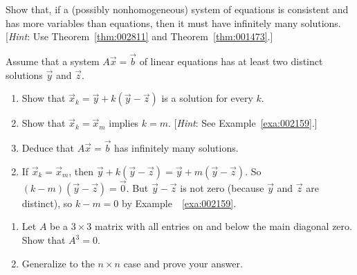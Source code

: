 \documentclass{ximera}
\begin{document}
\begin{problem}
Show that, if a (possibly nonhomogeneous) system of equations is consistent and has more variables than equations, then it must have infinitely many solutions. [\textit{Hint}: Use Theorem~\ref{thm:002811} and Theorem~\ref{thm:001473}.]

\end{problem}

\begin{problem}
Assume that a system $A\vec{x} = \vec{b}$ of linear equations has at least two distinct solutions $\vec{y}$ and $\vec{z}$.


\begin{enumerate}[label={\alph*.}]
\item Show that $\vec{x}_{k} = \vec{y} + k(\vec{y} - \vec{z})$ is a solution for every $k$.

\item Show that $\vec{x}_{k} = \vec{x}_{m}$ implies $k = m$. [\textit{Hint}: See Example~\ref{exa:002159}.]

\item Deduce that $A\vec{x} = \vec{b}$ has infinitely many solutions.

\end{enumerate}
\begin{hint}
\begin{enumerate}[label={\alph*.}]
\setcounter{enumi}{1}
\item  If $\vec{x}_{k} = \vec{x}_{m}$, then $\vec{y} + k(\vec{y} - \vec{z}) = \vec{y} + m(\vec{y} - \vec{z})$. So $(k - m)(\vec{y} - \vec{z}) = \vec{0}$. But $\vec{y} - \vec{z}$ is not zero (because $\vec{y}$ and $\vec{z}$ are distinct), so $k - m = 0$ by Example~~\ref{exa:002159}.

\end{enumerate}
\end{hint}
\end{problem}


\begin{problem}

\begin{enumerate}[label={\alph*.}]
\item Let $A$ be a $3 \times 3$ matrix with all entries on and below the main diagonal zero. Show that $A^{3} = 0$.

\item Generalize to the $n \times n$ case and prove your answer.

\end{enumerate}
\end{problem}
\end{document}
